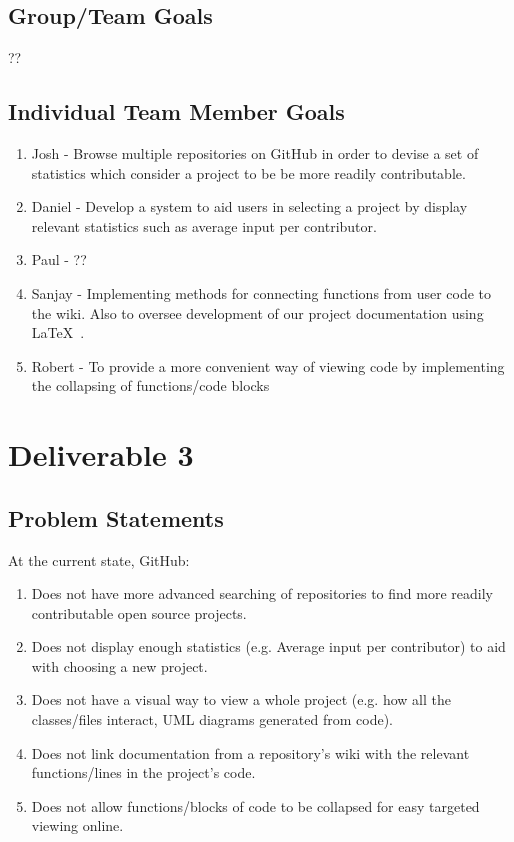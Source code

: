 \documentclass[12pt]{article}
\begin{document}
\subsection{Group/Team Goals}
??
\subsection{Individual Team Member Goals}
\begin{enumerate}
\item Josh - Browse multiple repositories on GitHub in order to devise a set of statistics which consider a project to be be more readily contributable.
\item Daniel - Develop a system to aid users in selecting a project by display relevant statistics such as average input per contributor.  
\item Paul - ??
\item Sanjay - Implementing methods for connecting functions from user code to the wiki. Also to oversee development of our project documentation using \LaTeX\ .
\item Robert - To provide a more convenient way of viewing code by implementing the collapsing of functions/code blocks 
\end{enumerate}

\setcounter{section}{3}
\setcounter{subsection}{0}
\section*{Deliverable 3}
\subsection{Problem Statements}
At the current state, GitHub:
\begin{enumerate}
\item  Does not have more advanced searching of repositories to find more readily contributable open source projects.
\item Does not display enough statistics (e.g. Average input per contributor) to aid with choosing a new project.
\item Does not  have a visual way to view a whole project (e.g. how all the classes/files interact, UML diagrams generated from code).
\item Does not link documentation from a repository's wiki with the relevant functions/lines in the project's code.
\item Does not allow functions/blocks of code to be collapsed for easy targeted viewing online.
\end{enumerate}
\end{document}
